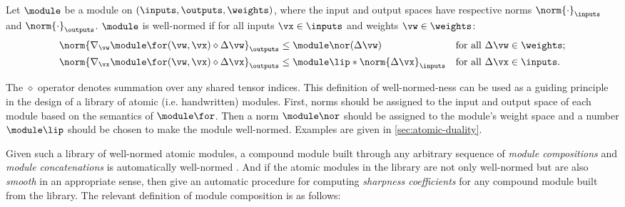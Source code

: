 \begin{mydefinition}\label{def:well-normed}
Let $\module$ be a module on $(\inputs, \outputs, \weights)$, where the input and output spaces have respective norms $\norm{\cdot}_{\inputs}$ and $\norm{\cdot}_{\outputs}$. $\module$ is well-normed if for all inputs $\vx\in\inputs$ and weights $\vw \in\weights$:
\begin{align}
\norm{\nabla_\vw\module\for(\vw,\vx)\diamond\Delta \vw}_\outputs &\leq \module\nor(\Delta \vw) &&\text{for all }\Delta\vw\in\weights;\\
\norm{\nabla_\vx\module\for(\vw,\vx)\diamond\Delta \vx}_\outputs & \leq \module\lip * \norm{\Delta \vx}_\inputs &&\text{for all }\Delta\vx\in\inputs.
\end{align}
\end{mydefinition}
The $\diamond$ operator denotes summation over any shared tensor indices. This definition of well-normed-ness can be used as a guiding principle in the design of a library of atomic (i.e. handwritten) modules. First, norms should be assigned to the input and output space of each module based on the semantics of $\module\for$. Then a norm $\module\nor$ should be assigned to the module's weight space and a number $\module\lip$ should be chosen to make the module well-normed. Examples are given in \cref{sec:atomic-duality}.

Given such a library of well-normed atomic modules, a compound module built through any arbitrary sequence of \textit{module compositions} and \textit{module concatenations} is automatically well-normed \citep{modula}. And if the atomic modules in the library are not only well-normed but are also \textit{smooth} in an appropriate sense, then \citet{modula} give an automatic procedure for computing \textit{sharpness coefficients} for any compound module built from the library. The relevant definition of module composition is as follows:

